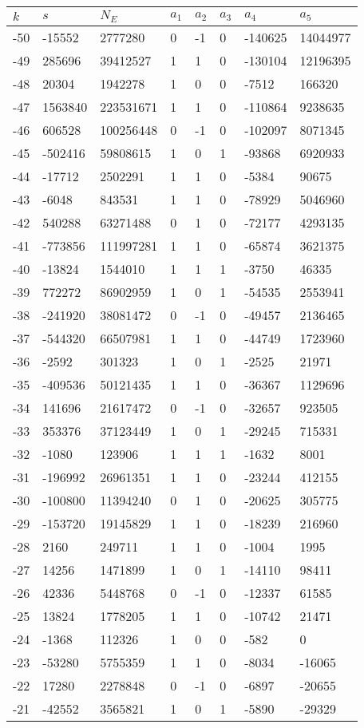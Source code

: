 \documentclass{amsart}
\begin{document}
\begin{longtable}{|l|l|l|lllll|}
\hline
$k$ & $s$ & $N_E$ & $a_1$ & $a_2$ & $a_3$ & $a_4$ & $a_5$\\
\hline
-50&-15552&2777280&0&-1&0&-140625&14044977\\
-49&285696&39412527&1&1&0&-130104&12196395\\
-48&20304&1942278&1&0&0&-7512&166320\\
-47&1563840&223531671&1&1&0&-110864&9238635\\
-46&606528&100256448&0&-1&0&-102097&8071345\\
-45&-502416&59808615&1&0&1&-93868&6920933\\
-44&-17712&2502291&1&1&0&-5384&90675\\
-43&-6048&843531&1&1&0&-78929&5046960\\
-42&540288&63271488&0&1&0&-72177&4293135\\
-41&-773856&111997281&1&1&0&-65874&3621375\\
-40&-13824&1544010&1&1&1&-3750&46335\\
-39&772272&86902959&1&0&1&-54535&2553941\\
-38&-241920&38081472&0&-1&0&-49457&2136465\\
-37&-544320&66507981&1&1&0&-44749&1723960\\
-36&-2592&301323&1&0&1&-2525&21971\\
-35&-409536&50121435&1&1&0&-36367&1129696\\
-34&141696&21617472&0&-1&0&-32657&923505\\
-33&353376&37123449&1&0&1&-29245&715331\\
-32&-1080&123906&1&1&1&-1632&8001\\
-31&-196992&26961351&1&1&0&-23244&412155\\
-30&-100800&11394240&0&1&0&-20625&305775\\
-29&-153720&19145829&1&1&0&-18239&216960\\
-28&2160&249711&1&1&0&-1004&1995\\
-27&14256&1471899&1&0&1&-14110&98411\\
-26&42336&5448768&0&-1&0&-12337&61585\\
-25&13824&1778205&1&1&0&-10742&21471\\
-24&-1368&112326&1&0&0&-582&0\\
-23&-53280&5755359&1&1&0&-8034&-16065\\
-22&17280&2278848&0&-1&0&-6897&-20655\\
-21&-42552&3565821&1&0&1&-5890&-29329\\

\end{longtable}
\end{document}
